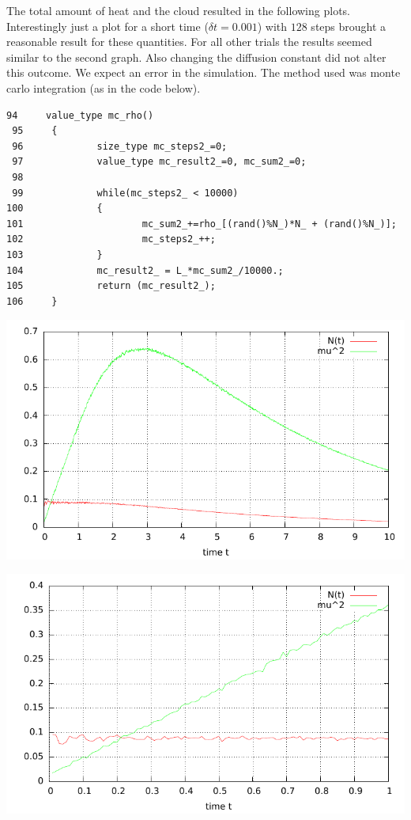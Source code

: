 \documentclass[12pt]{scrbook}
\begin{document}
The total amount of heat and the cloud resulted in the following plots. Interestingly just a plot for a short time ($\delta t= 0.001$) with $128$ steps brought a reasonable result for these quantities. For all other trials the results seemed similar to the second graph. Also changing the diffusion constant did not alter this outcome. We expect an error in the simulation. The method used was monte carlo integration (as in the code below).
\begin{lstlisting}[language=CodeBlocks]
 94     value_type mc_rho()
 95     {
 96             size_type mc_steps2_=0;
 97             value_type mc_result2_=0, mc_sum2_=0;
 98 
 99             while(mc_steps2_ < 10000)
100             {
101                     mc_sum2_+=rho_[(rand()%N_)*N_ + (rand()%N_)];
102                     mc_steps2_++;
103             }
104             mc_result2_ = L_*mc_sum2_/10000.;
105             return (mc_result2_);
106     }
\end{lstlisting}

\begin{minipage}[!t]{0.45\textwidth}
\includegraphics[width=\textwidth, keepaspectratio]{rho_evolution.pdf}
\end{minipage}
\begin{minipage}[!t]{0.45\textwidth}
\includegraphics[width=\textwidth]{rho_evolution_high_time.pdf}
\end{minipage}
\end{document}
